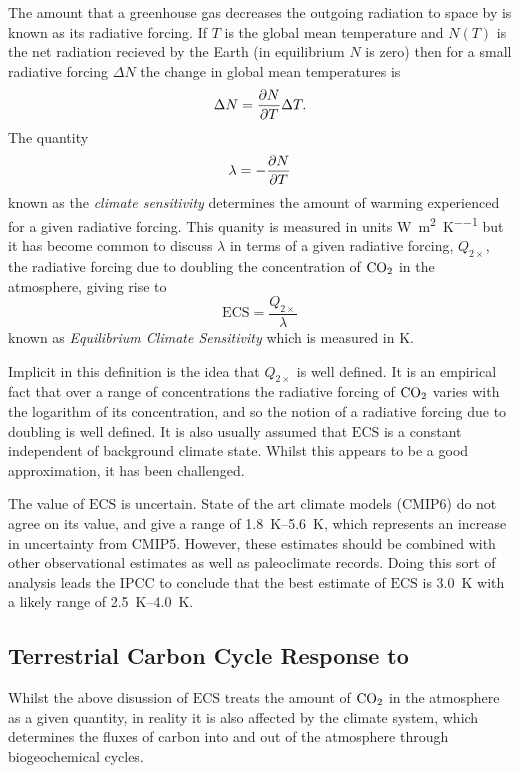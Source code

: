 The amount that a greenhouse gas decreases the outgoing radiation to space by is known as its radiative forcing. If $T$ is
the global mean temperature and $N(T)$ is the net radiation recieved by the Earth (in equilibrium $N$ is zero) then for a small
radiative forcing $\Delta N$ the change in global mean temperatures is
\begin{equation}
  \label{eq:response_to_radiative_forcing}
  \Delta N = \pdv{N}{T} \Delta T.
\end{equation}
The quantity
\begin{equation}
  \label{eq:climate_sensitivity}
  \lambda = -\pdv{N}{T}
\end{equation}
known as the \emph{climate sensitivity} determines the amount of warming experienced for a given radiative forcing. This quanity is measured
in units \si{\watt\per\square\meter\per\kelvin} but it has become common to discuss $\lambda$ in terms of a given radiative forcing, $Q_{2\times}$,
the radiative forcing due to doubling the concentration of $\ce{CO2}$ in the atmosphere, giving rise to
\begin{equation}
  \label{eq:definition_of_ECS}
  \mathrm{ECS} = \frac{Q_{2\times}}{\lambda}
\end{equation}
known as \emph{Equilibrium Climate Sensitivity} which is measured in \si{\kelvin}.

Implicit in this definition is the idea that $Q_{2\times}$ is well defined. It is an empirical fact that over a range of concentrations the radiative forcing
of $\ce{CO2}$ varies with the logarithm of its concentration, and so the notion of a radiative forcing due to doubling is well defined. It is also usually assumed that
$\mathrm{ECS}$ is a constant independent of background climate state. Whilst this appears to be a good approximation, it has been challenged.

The value of $\mathrm{ECS}$ is uncertain. State of the art climate models (CMIP6) do not agree on its value, and give a range of \SIrange{1.8}{5.6}{\kelvin}, which represents an
increase in uncertainty from CMIP5. However, these estimates should be combined with other observational estimates as well as paleoclimate records. Doing this sort of
analysis leads the IPCC to conclude that the best estimate of $\mathrm{ECS}$ is \SI{3.0}{\kelvin} with a likely range of \SIrange{2.5}{4.0}{\kelvin}.

\subsection{Terrestrial Carbon Cycle Response to }
Whilst the above disussion of $\mathrm{ECS}$ treats the amount of $\ce{CO2}$ in the atmosphere as a given quantity, in reality it is also affected by the climate
system, which determines the fluxes of carbon into and out of the atmosphere through biogeochemical cycles.

